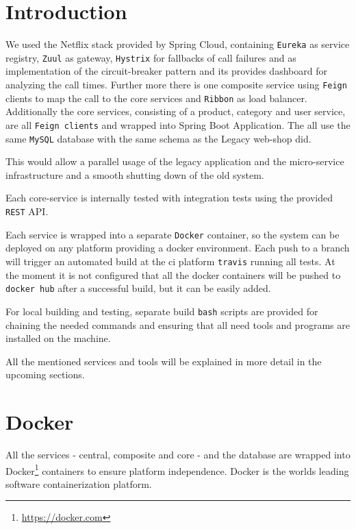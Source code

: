 \documentclass[11pt]{article}
\begin{document}
	\tableofcontents
	\newpage
	
	\section{Introduction}	
	We used the Netflix stack provided by Spring Cloud, containing \texttt{Eureka} as service registry, \texttt{Zuul} as gateway, \texttt{Hystrix} for fallbacks of call failures and as implementation of the circuit-breaker pattern and its provides dashboard for analyzing the call times. Further more there is one composite service using \texttt{Feign} clients to map the call to the core services and \texttt{Ribbon} as load balancer. Additionally the core services, consisting of a product, category and user service, are all \texttt{Feign clients} and wrapped into Spring Boot Application. The all use the same \texttt{MySQL} database with the same schema as the Legacy web-shop did.
	
	This would allow a parallel usage of the legacy application and the micro-service infrastructure and a smooth shutting down of the old system.
	
	Each core-service is internally tested with integration tests using the provided \texttt{REST} API.
	
	Each service is wrapped into a separate \texttt{Docker} container, so the system can be deployed on any platform providing a docker environment. Each push to a branch will trigger an automated build at the ci platform \texttt{travis} running all tests. At the moment it is not configured that all the docker containers will be pushed to \texttt{docker hub} after a successful build, but it can be easily added.
	
	For local building and testing, separate build \texttt{bash} scripts are provided for chaining the needed commands and ensuring that all need tools and programs are installed on the machine.
	
	All the mentioned services and tools will be explained in more detail in the upcoming sections.
	
	\section{Docker}
	All the services - central, composite and core - and the database are wrapped into Docker\footnote{\url{https://docker.com}} containers to ensure platform independence. Docker is the worlds leading software containerization platform. 
	
\end{document}
